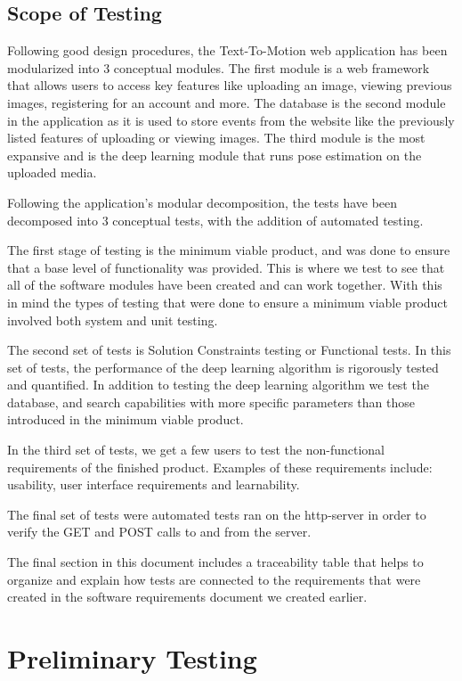 \documentclass{scrreprt}
\begin{document}
\section{Scope of Testing}

Following good design procedures, the Text-To-Motion web application has been
modularized into $3$ conceptual modules.  The first module is a web framework that allows users to access key features like uploading an image, viewing previous images, registering for an account and more. The database is the second module in the application as it is used to store events from the website like the previously listed features of uploading or viewing images. The third module is the most expansive and is the deep learning module that runs pose estimation on the uploaded media.

Following the application's modular decomposition, the tests have been decomposed into $3$ conceptual tests, with the addition of automated testing.

The first stage of testing is the minimum viable product, and was done to ensure
that a base level of functionality was provided. This is where we test to see that all of the software modules have been created and can work together. With this in mind the types of testing that were done to ensure a minimum viable product involved both system and unit testing.

The second set of tests is Solution Constraints testing or Functional tests.  In this set of tests, the performance of the deep learning algorithm is rigorously tested and quantified. In addition to testing the deep learning algorithm we test the database, and search capabilities with more specific parameters than those introduced in the minimum viable product.

In the third set of tests, we get a few users to test the non-functional requirements of the finished product. Examples of these requirements include: usability, user interface requirements and learnability.

The final set of tests were automated tests ran on the http-server in order to verify the GET and POST calls to and from the server. 

The final section in this document includes a traceability table that helps to organize and explain how tests are connected to the requirements that were created in the software requirements document we created earlier.

\chapter{Preliminary Testing}
\end{document}
